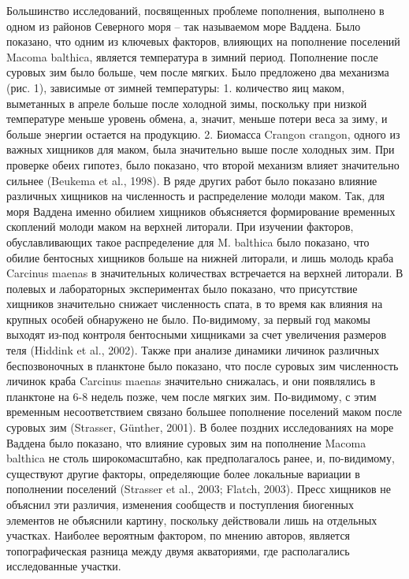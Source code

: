 Большинство исследований, посвященных проблеме пополнения, выполнено в одном из районов Северного моря – так называемом море Ваддена. Было показано, что одним из ключевых факторов, влияющих на пополнение поселений Macoma balthica, является температура в зимний период. Пополнение после суровых зим было больше, чем после мягких. Было предложено два механизма (рис. 1), зависимые от зимней температуры: 1. количество яиц маком, выметанных в апреле больше после холодной зимы, поскольку при низкой температуре меньше уровень обмена, а, значит, меньше потери веса за зиму, и больше энергии остается на продукцию. 2. Биомасса Crangon crangon, одного из важных хищников для маком, была значительно выше после холодных зим. При проверке обеих гипотез, было показано, что второй механизм влияет значительно сильнее (Beukema et al., 1998). 	
В ряде других работ было показано влияние различных хищников на численность и распределение молоди маком. Так, для моря Ваддена именно обилием хищников объясняется формирование временных скоплений молоди маком на верхней литорали. При изучении факторов, обуславливающих такое распределение для M. balthica было показано, что обилие бентосных хищников больше на нижней литорали, и лишь молодь краба Carcinus maenas в значительных количествах встречается на верхней литорали. В полевых и лабораторных экспериментах было показано, что присутствие хищников значительно снижает численность спата, в то время как влияния на крупных особей обнаружено не было. По-видимому, за первый год макомы выходят из-под контроля бентосными хищниками за счет увеличения размеров теля (Hiddink et al., 2002). 
 Также при анализе динамики личинок различных беспозвоночных в планктоне было показано, что после суровых зим численность личинок краба Carcinus maenas значительно снижалась, и они появлялись в планктоне на 6-8 недель позже, чем после мягких зим. По-видимому, с этим временным несоответствием связано большее пополнение поселений маком после суровых зим (Strasser, Günther, 2001).
В более поздних исследованиях на море Ваддена было показано, что влияние суровых зим на пополнение Macoma balthica не столь широкомасштабно, как предполагалось ранее, и, по-видимому, существуют другие факторы, определяющие более локальные вариации в пополнении поселений (Strasser et al., 2003; Flatch, 2003).
Пресс хищников не объяснил эти различия, изменения сообществ и поступления биогенных элементов не объяснили картину, поскольку действовали лишь на отдельных участках. Наиболее вероятным фактором, по мнению авторов, является топографическая разница между двумя акваториями, где располагались исследованные участки. 
